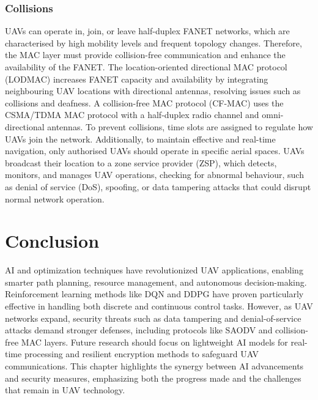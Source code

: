 \subsubsection{Collisions}

UAVs can operate in, join, or leave half-duplex FANET networks, which are characterised by high mobility levels and frequent topology changes. Therefore, the MAC layer must provide collision-free communication and enhance the availability of the FANET. The location-oriented directional MAC protocol (LODMAC) increases FANET capacity and availability by integrating neighbouring UAV locations with directional antennas, resolving issues such as collisions and deafness. A collision-free MAC protocol (CF-MAC) uses the CSMA/TDMA MAC protocol with a half-duplex radio channel and omni-directional antennas. To prevent collisions, time slots are assigned to regulate how UAVs join the network. Additionally, to maintain effective and real-time navigation, only authorised UAVs should operate in specific aerial spaces. UAVs broadcast their location to a zone service provider (ZSP), which detects, monitors, and manages UAV operations, checking for abnormal behaviour, such as denial of service (DoS), spoofing, or data tampering attacks that could disrupt normal network operation.


\section{Conclusion}

AI and optimization techniques have revolutionized UAV applications, enabling smarter path planning, resource management, and autonomous decision-making. Reinforcement learning methods like DQN and DDPG have proven particularly effective in handling both discrete and continuous control tasks. However, as UAV networks expand, security threats such as data tampering and denial-of-service attacks demand stronger defenses, including protocols like SAODV and collision-free MAC layers. Future research should focus on lightweight AI models for real-time processing and resilient encryption methods to safeguard UAV communications. This chapter highlights the synergy between AI advancements and security measures, emphasizing both the progress made and the challenges that remain in UAV technology.